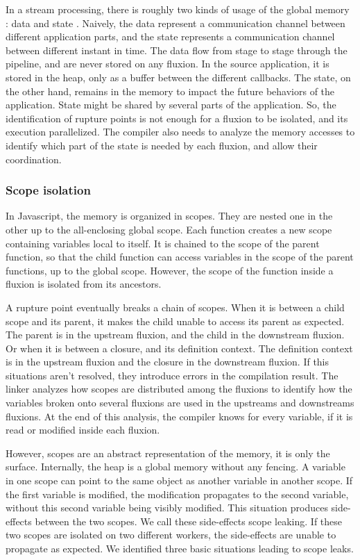 In a stream processing, there is roughly two kinds of usage of the global memory : data and state \cite{Fernandez2014a}.
Naively, the data represent a communication channel between different application parts, and the state represents a communication channel between different instant in time.
The data flow from stage to stage through the pipeline, and are never stored on any fluxion. In the source application, it is stored in the heap, only as a buffer between the different callbacks.
The state, on the other hand, remains in the memory to impact the future behaviors of the application.
State might be shared by several parts of the application.
So, the identification of rupture points is not enough for a fluxion to be isolated, and its execution parallelized.
The compiler also needs to analyze the memory accesses to identify which part of the state is needed by each fluxion, and allow their coordination.




\subsubsection{Scope isolation}

In Javascript, the memory is organized in scopes.
They are nested one in the other up to the all-enclosing global scope.
Each function creates a new scope containing variables local to itself.
It is chained to the scope of the parent function, so that the child function can access variables in the scope of the parent functions, up to the global scope.
However, the scope of the function inside a fluxion is isolated from its ancestors.

A rupture point eventually breaks a chain of scopes.
When it is between a child scope and its parent, it makes the child unable to access its parent as expected.
The parent is in the upstream fluxion, and the child in the downstream fluxion.
Or when it is between a closure, and its definition context.
The definition context is in the upstream fluxion and the closure in the downstream fluxion.
If this situations aren't resolved, they introduce errors in the compilation result.
The linker analyzes how scopes are distributed among the fluxions to identify how the variables broken onto several fluxions are used in the upstreams and downstreams fluxions.
At the end of this analysis, the compiler knows for every variable, if it is read or modified inside each fluxion.

However, scopes are an abstract representation of the memory, it is only the surface.
Internally, the heap is a global memory without any fencing.
A variable in one scope can point to the same object as another variable in another scope.
If the first variable is modified, the modification propagates to the second variable, without this second variable being visibly modified.
This situation produces side-effects between the two scopes.
We call these side-effects scope leaking.
If these two scopes are isolated on two different workers, the side-effects are unable to propagate as expected.
We identified three basic situations leading to scope leaks.

